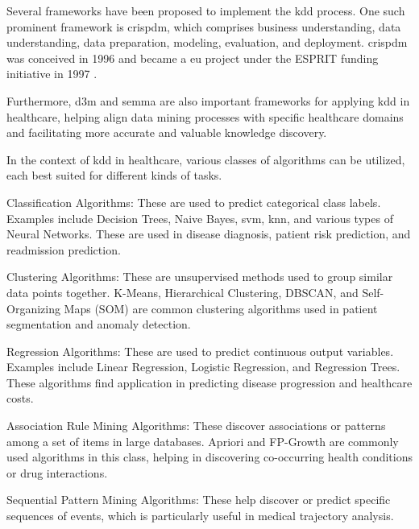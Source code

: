 Several frameworks have been proposed to implement the \ac{kdd} process. One such prominent framework is \ac{crispdm}, which comprises business understanding, data understanding, data preparation, modeling, evaluation, and deployment. \ac{crispdm} was conceived in 1996 and became a \ac{eu} project under the ESPRIT funding initiative in 1997 \cite{Chapman2000CRISPDM1S}. %

Furthermore, \ac{d3m} 
\cite{huangDataMiningIntegrated2009} and \ac{semma} \cite{rohanizadehProposedDataMining2009} are also important frameworks for applying \ac{kdd} in healthcare, helping align data mining processes with specific healthcare domains and facilitating more accurate and valuable knowledge discovery.

In the context of \ac{kdd} in healthcare, various classes of algorithms can be utilized, each best suited for different kinds of tasks.

Classification Algorithms: These are used to predict categorical class labels. Examples include Decision Trees, Naive Bayes, \ac{svm}, \ac{knn}, and various types of Neural Networks. These are used in disease diagnosis, patient risk prediction, and readmission prediction.

Clustering Algorithms: These are unsupervised methods used to group similar data points together. K-Means, Hierarchical Clustering, DBSCAN, and Self-Organizing Maps (SOM) are common clustering algorithms used in patient segmentation and anomaly detection.

Regression Algorithms: These are used to predict continuous output variables. Examples include Linear Regression, Logistic Regression, and Regression Trees. These algorithms find application in predicting disease progression and healthcare costs.

Association Rule Mining Algorithms: These discover associations or patterns among a set of items in large databases. Apriori and FP-Growth are commonly used algorithms in this class, helping in discovering co-occurring health conditions or drug interactions.

Sequential Pattern Mining Algorithms: These help discover or predict specific sequences of events, which is particularly useful in medical trajectory analysis.

